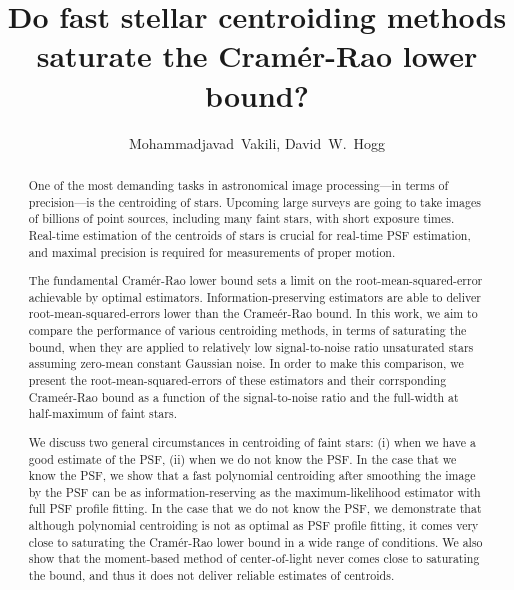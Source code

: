 \documentclass[12pt, preprint]{aastex}
\begin{document}
\author{
  Mohammadjavad~Vakili,
  David~W.~Hogg}

\title{Do fast stellar centroiding methods saturate the Cram\'{e}r-Rao lower bound?}

\begin{abstract}
One of the most demanding tasks in astronomical image processing---in terms of precision---is 
the centroiding of stars. Upcoming large surveys are going to take images of 
billions of point sources, including many faint stars, with short exposure times. 
Real-time estimation of the centroids of stars is crucial for real-time PSF estimation, 
and maximal precision is required for measurements of proper motion. 

The fundamental Cram\'{e}r-Rao lower bound sets a limit on the root-mean-squared-error 
achievable by optimal estimators. Information-preserving estimators are able to deliver 
root-mean-squared-errors lower than the Crame\'{e}r-Rao bound. In this work, we aim to compare 
the performance of various centroiding methods, in terms of saturating the bound, when they 
are applied to relatively low signal-to-noise ratio unsaturated stars assuming zero-mean 
constant Gaussian noise. In order to make this comparison, we present the root-mean-squared-errors of 
these estimators and their corrsponding Crame\'{e}r-Rao bound as a function of the signal-to-noise ratio 
and the full-width at half-maximum of faint stars. 

We discuss two general circumstances in centroiding of faint stars: (i) when we have a good estimate
of the PSF, (ii) when we do not know the PSF. In the case that we know the PSF, 
we show that a fast polynomial centroiding after smoothing the image by the PSF can be 
as information-reserving as the maximum-likelihood estimator with full PSF profile fitting. 
In the case that we do not know the PSF, we demonstrate that although polynomial centroiding 
is not as optimal as PSF profile fitting, it comes very close to saturating the Cram\'{e}r-Rao lower bound
in a wide range of conditions. We also show that the moment-based method of center-of-light 
never comes close to saturating the bound, and thus it does not deliver reliable estimates of centroids.    
\end{abstract}
\end{document}
